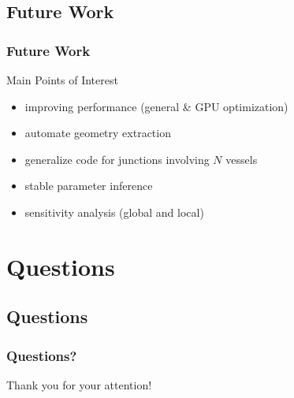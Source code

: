 \documentclass[compress]{beamer}
\begin{document}
\subsection{Future Work}
\begin{frame}
	\frametitle{Future Work}
	\begin{block}{Main Points of Interest}
		\begin{itemize}
			\item<1-> improving performance (general \& GPU optimization)
			\item<2-> automate geometry extraction
			\item<3-> generalize code for junctions involving $N$ vessels
			\item<4-> stable parameter inference
			\item<5-> sensitivity analysis (global and local)
		\end{itemize}
	\end{block}
	\vspace{5mm}
\end{frame}


\section{Questions}
\subsection{Questions}
\begin{frame}
	\frametitle{Questions?}
	Thank you for your attention!
\end{frame}
\end{document}
